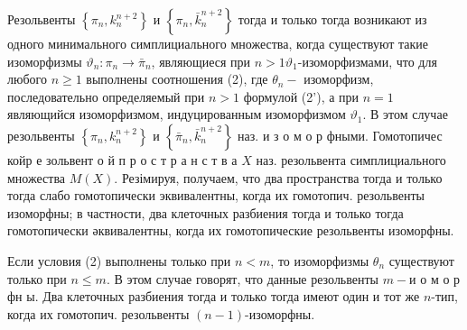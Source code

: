 \documentclass[10pt]{article}
\begin{document}
Резольвенты $\left\{\pi_{n}, k_{n}^{n+2}\right\}$ и $\left\{\pi_{n}, \bar{k}_{n}^{n+2}\right\}$ тогда и только тогда возникают из одного минимального симплициального множества, когда существуют такие изоморфизмы $\vartheta_{n}: \pi_{n} \rightarrow \bar{\pi}_{n}$, являющиеся при $n>1 \vartheta_{1}$-изоморфизмами, что для любого $n \geqslant 1$ выполнены соотношения (2), где $\theta_{n}-$ изоморфизм, последовательно определяемый при $n>1$ формулой (2'), а при $n=1$ являющийся изоморфизмом, индуцированным изоморфизмом $\vartheta_{1}$. В этом случае резольвенты $\left\{\pi_{n}, k_{n}^{n+2}\right\}$ и $\left\{\bar{\pi}_{n}, \bar{k}_{n}^{n+2}\right\}$ наз. и з о м о р фными. Гомотопичес койр е зольвент о й п р о с т р а н с т в а $X$ наз. резольвента симплициального множества $M(X)$. Резімируя, получаем, что два пространства тогда и только тогда слабо гомотопически эквивалентны, когда их гомотопич. резольвенты изоморфны; в частности, два клеточных разбиения тогда и только тогда гомотопически әквивалентны, когда их гомотопические резольвенты изоморфны.



Если условия (2) выполнены только при $n<m$, то изоморфизмы $\theta_{n}$ существуют только при $n \leqslant m$. В этом случае говорят, что данные резольвенты $m-и$ о м о р фн ы. Два клеточных разбиения тогда и только тогда имеют один и тот же $n$-тип, когда их гомотопич. резольвенты $(n-1)$-изоморфны.
\end{document}
